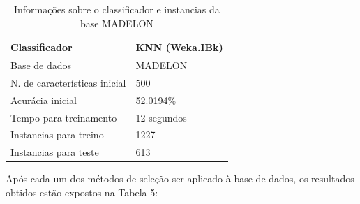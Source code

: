 \begin{table}[H]
\centering
\caption{Informações sobre o classificador e instancias da base MADELON}
\label{my-label}
\begin{tabular}{|l|l|}
\hline
\textbf{Classificador}        & \multicolumn{1}{c|}{\textbf{KNN (Weka.IBk)}} \\ \hline
Base de dados                 & MADELON                               \\ \hline
N. de características inicial & 500                                        \\ \hline
Acurácia inicial        & 52.0194\%                                   \\ \hline
Tempo para treinamento        & 12 segundos                                  \\ \hline
Instancias para treino        & 1227                                          \\ \hline
Instancias para teste         & 613                                          \\ \hline
\end{tabular}
\end{table}


Após cada um dos métodos de seleção ser aplicado à base de dados, os resultados obtidos estão expostos na Tabela 5:


